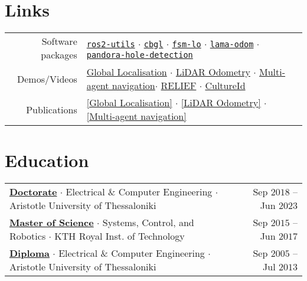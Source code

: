 \documentclass[a4paper,10pt,twoside]{article}
\newcommand{\verticalspacebetweensections}{\vspace{0em}}
\newcommand{\verticalspacebetweensectionandcontent}{\vspace{0.4em}}
\begin{document}
\section{\textbf{Links}}\verticalspacebetweensectionandcontent\hspace{-2.3em}
\begin{tabular}{rl}

  Software packages &
  \href{https://github.com/li9i/ros2-utils}{\texttt{ros2-utils}} $\cdot$
  \href{https://github.com/li9i/cbgl}{\texttt{cbgl}} $\cdot$
  \href{https://github.com/fourier-scan-matcher/fsm}{\texttt{fsm-lo}} $\cdot$
  \href{https://github.com/li9i/lama-odom}{\texttt{lama-odom}} $\cdot$
  \href{https://github.com/li9i/pandora\_vision\_2014/tree/hydro-devel/pandora\_vision\_hole\_detector}{\texttt{pandora-hole-detection}} \\

  Demos/Videos &
  \href{https://www.youtube.com/watch?v=xaDKjI0WkDc}{\hphantom{[}Global Localisation\hphantom{]}} $\cdot$
  \href{https://www.youtube.com/watch?v=hB4qsHCEXGI}{\hphantom{[}LiDAR Odometry\hphantom{]}} $\cdot$
  \href{https://www.youtube.com/watch?v=937OZez1iN8}{\hphantom{[}Multi-agent navigation\hphantom{]}}$\cdot$
  \href{https://relief.web.auth.gr/#pg-72-1}{RELIEF} $\cdot$
  \href{https://cultureid.web.auth.gr/?page_id=200&lang=en#pl-200}{CultureId}
  \\
  Publications &
  \href{https://ieeexplore.ieee.org/abstract/document/10802235}{[Global Localisation]} $\cdot$
  \href{https://ieeexplore.ieee.org/abstract/document/9981228}{[LiDAR Odometry]} $\cdot$
  \href{https://www.tandfonline.com/doi/full/10.1080/00207179.2018.1514129}{[Multi-agent navigation]}
\end{tabular}
\verticalspacebetweensections

\section{\textbf{Education}}\verticalspacebetweensectionandcontent

{\hspace{-2em}
\begin{tabular}{l@{\hspace{1em}}r}
  \href{https://ikee.lib.auth.gr/record/354644}{\textbf{Doctorate}} $\cdot$ Electrical \& Computer Engineering $\cdot$ Aristotle University of Thessaloniki & {\small \textcolor{datecolour}{Sep $2018$ -- Jun $2023$}} \\
  \href{http://kth.diva-portal.org/smash/record.jsf?pid=diva2\%3A1102597\&dswid=2875}{\textbf{Master of Science}} $\cdot$ Systems, Control, and Robotics $\cdot$ KTH Royal Inst. of Technology & {\small \textcolor{datecolour}{Sep $2015$ -- Jun $2017$}} \\
  \href{https://ikee.lib.auth.gr/record/291560}{\textbf{Diploma}} $\cdot$ Electrical \& Computer Engineering $\cdot$ Aristotle University of Thessaloniki & {\small \textcolor{datecolour}{Sep $2005$ -- Jul $2013$}}
\end{tabular}}
\verticalspacebetweensections
\end{document}
